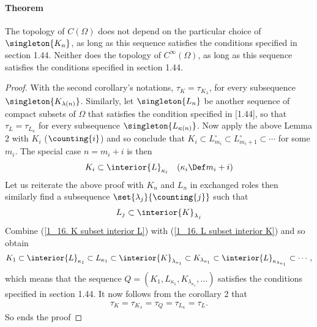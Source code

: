 \paragraph{Theorem} 
The topology of $C(\Omega)$ does not depend on the particular choice of 
$\singleton{K_n}$, as long as this sequence satisfies the conditions 
specified in section 1.44. Neither does the topology of $C^\infty (\Omega)$, 
as long as this sequence satisfies the conditions specified in section 1.44.
%
\begin{proof}%
With the second corollary's notations,
% 
  $\tau_{K} = \tau_{K_\lambda}$,
%
for every subsequence $\singleton{K_{\lambda(n)}}$.
% 
Similarly, let 
%
  $\singleton{L_n}$ 
% 
be another sequence of compact subsets of $\Omega$ that satisfies 
the condition specified in [1.44], 
so that 
%
  $\tau_{L} = \tau_{L_\kappa}$
%
for every subsequence $\singleton{L_{\kappa(n)}}$. 
%
Now apply the above Lemma 2 with $K_i$ ($\counting{i}$) and so conclude that  
%
  $K_i 
    \subset 
  L^\circ_{m_i} 
    \subset 
  L^\circ_{m_{i}+1}
    \subset
  \cdots$
%  
for some $m_i$. The special case $n= m_i + i$ is then 
%
  \begin{align}
    \label{1_16. K subset interior L}
    K_i
      \subset 
    \interior{L}_{\kappa_i}
      \quad 
    (\kappa_i \Def m_i + i)
  \end{align} 
%
Let us reiterate the above proof with $K_n$ and $L_n$ in exchanged roles 
then similarly find a subsequence $\set{\lambda_j}{\counting{j}}$ such that 
%
  \begin{align}
  \label{1_16. L subset interior K}
    L_j \subset \interior{K}_{\lambda_j}
  \end{align}
%
Combine 
%
  (\ref{1_16. K subset interior L}) with 
  (\ref{1_16. L subset interior K}) 
%
and so obtain
%
  \begin{align}
    K_1 
      \subset 
    \interior{L}_{\kappa_1} 
      \subset 
    L_{\kappa_1} 
      \subset 
    \interior{K}_{\lambda_{\kappa_1}}
      \subset 
    K_{\lambda_{\kappa_1}}
      \subset
    \interior{L}_{\kappa_{\lambda_{\kappa_1}}}
      \subset
    \cdots, 
  \end{align}
%
which means that the sequence 
%
  $Q = (
    K_1, 
    L_{\kappa_1}, 
    K_{\lambda_{\kappa_1}}, 
    \dots
  )$
%
satisfies the conditions specified in section 1.44. 
It now follows from the corollary 2 that 
%
  \begin{align}  
    \tau_{K} 
    = 
      \tau_{K_\lambda} 
    = 
      \tau_{Q} 
    = 
      \tau_{L_\kappa} 
    = \tau_{L}.
  \end{align} 
%
So ends the proof
\end{proof}
